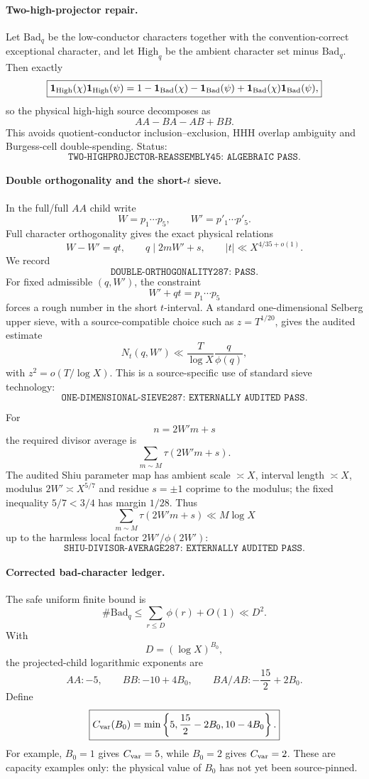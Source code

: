 \documentclass[11pt]{article}
\theoremstyle{definition}
\newcommand{\1}{\mathbf 1}
\begin{document}
\paragraph{Two-high-projector repair.}
Let $\mathrm{Bad}_q$ be the low-conductor characters together with the
convention-correct exceptional character, and let $\mathrm{High}_q$ be the ambient
character set minus $\mathrm{Bad}_q$.  Then exactly
\[
\boxed{
\mathbf1_{\rm High}(\chi)\mathbf1_{\rm High}(\psi)
=
1-\mathbf1_{\rm Bad}(\chi)-\mathbf1_{\rm Bad}(\psi)
+\mathbf1_{\rm Bad}(\chi)\mathbf1_{\rm Bad}(\psi),
}
\]
so the physical high-high source decomposes as
\[
\boxed{AA-BA-AB+BB.}
\]
This avoids quotient-conductor inclusion--exclusion, HHH overlap ambiguity and
Burgess-cell double-spending.  Status:
\[
\boxed{\texttt{TWO-HIGHPROJECTOR-REASSEMBLY45: ALGEBRAIC PASS}.}
\]

\paragraph{Double orthogonality and the short-$t$ sieve.}
In the full/full $AA$ child write
\[
W=p_1\cdots p_5,\qquad W'=p'_1\cdots p'_5.
\]
Full character orthogonality gives the exact physical relations
\[
\boxed{W-W'=qt},
\qquad
\boxed{q\mid 2mW'+s},
\qquad
|t|\ll X^{4/35+o(1)}.
\]
We record
\[
\texttt{DOUBLE-ORTHOGONALITY287: PASS}.
\]
For fixed admissible $(q,W')$, the constraint
\[
W'+qt=p_1\cdots p_5
\]
forces a rough number in the short $t$-interval.  A standard one-dimensional Selberg upper
sieve, with a source-compatible choice such as $z=T^{1/20}$, gives the audited estimate
\[
N_t(q,W')
\ll
\frac{T}{\log X}\frac{q}{\phi(q)},
\]
with $z^2=o(T/\log X)$.  This is a source-specific use of standard sieve technology:
\[
\texttt{ONE-DIMENSIONAL-SIEVE287: EXTERNALLY AUDITED PASS}.
\]

For
\[
n=2W'm+s
\]
the required divisor average is
\[
\sum_{m\sim M}\tau(2W'm+s).
\]
The audited Shiu parameter map has ambient scale $\asymp X$, interval length $\asymp X$,
modulus $2W'\asymp X^{5/7}$ and residue $s=\pm1$ coprime to the modulus; the fixed
inequality $5/7<3/4$ has margin $1/28$.  Thus
\[
\sum_{m\sim M}\tau(2W'm+s)
\ll M\log X
\]
up to the harmless local factor $2W'/\phi(2W')$:
\[
\texttt{SHIU-DIVISOR-AVERAGE287: EXTERNALLY AUDITED PASS}.
\]

\paragraph{Corrected bad-character ledger.}
The safe uniform finite bound is
\[
\#\mathrm{Bad}_q
\le
\sum_{r\le D}\phi(r)+O(1)
\ll D^2.
\]
With
\[
D=(\log X)^{B_0},
\]
the projected-child logarithmic exponents are
\[
AA:-5,\qquad
BB:-10+4B_0,\qquad
BA/AB:-\frac{15}{2}+2B_0.
\]
Define
\[
\boxed{
C_{\rm var}(B_0)
=
\min\left\{
5,\frac{15}{2}-2B_0,10-4B_0
\right\}.
}
\]
For example, $B_0=1$ gives $C_{\rm var}=5$, while $B_0=2$ gives $C_{\rm var}=2$.
These are capacity examples only: the physical value of $B_0$ has not yet been source-pinned.
\end{document}

